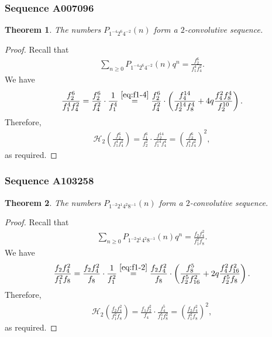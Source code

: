 \documentclass[12pt,reqno]{amsart}
\numberwithin{equation}{section}
\theoremstyle{plain}
\newtheorem{theorem}{Theorem}[section]
\theoremstyle{definition}
\theoremstyle{named}
\newcommand{\HH}{\mathcal{H}}
\begin{document}
\subsubsection{Sequence A007096}

\begin{theorem}\label{th:A007096}
	The numbers $P_{1^{-4} 2^6 4^{-2}}(n)$ form a $2$-convolutive sequence.
\end{theorem}

\begin{proof}
	Recall that
	\begin{align*}
		\sum_{n\ge 0} P_{1^{-4} 2^6 4^{-2}}(n) q^n = \frac{f_2^6}{f_1^4 f_4^2}.
	\end{align*}
	We have
	\begin{align*}
		\frac{f_2^6}{f_1^4 f_4^2} = \frac{f_2^6}{f_4^2}\cdot \frac{1}{f_1^4} \overset{\eqref{eq:f1-4}}{=} \frac{f_2^6}{f_4^2}\cdot \left(\frac{f_4^{14}}{f_2^{14}f_8^4}+4q\frac{f_4^2f_8^4}{f_2^{10}}\right).
	\end{align*}
	Therefore,
	\begin{align*}
		\HH_2\left(\frac{f_2^6}{f_1^4 f_4^2}\right) = \frac{f_1^6}{f_2^2}\cdot \frac{f_2^{14}}{f_1^{14}f_4^4} = \left(\frac{f_2^6}{f_1^4 f_4^2}\right)^2,
	\end{align*}
	as required.
\end{proof}

\subsubsection{Sequence A103258}

\begin{theorem}\label{th:A103258}
	The numbers $P_{1^{-2} 2^1 4^{2} 8^{-1}}(n)$ form a $2$-convolutive sequence.
\end{theorem}

\begin{proof}
	Recall that
	\begin{align*}
		\sum_{n\ge 0} P_{1^{-2} 2^1 4^{2} 8^{-1}}(n) q^n = \frac{f_2 f_4^2}{f_1^2 f_8}.
	\end{align*}
	We have
	\begin{align*}
		\frac{f_2 f_4^2}{f_1^2 f_8} = \frac{f_2 f_4^2}{f_8}\cdot \frac{1}{f_1^2} \overset{\eqref{eq:f1-2}}{=} \frac{f_2 f_4^2}{f_8}\cdot \left(\frac{f_8^5}{f_2^5f_{16}^2}+2q\frac{f_4^2f_{16}^2}{f_2^5f_8}\right).
	\end{align*}
	Therefore,
	\begin{align*}
		\HH_2\left(\frac{f_2 f_4^2}{f_1^2 f_8}\right) = \frac{f_1 f_2^2}{f_4}\cdot \frac{f_4^5}{f_1^5f_{8}^2} = \left(\frac{f_2 f_4^2}{f_1^2 f_8}\right)^2,
	\end{align*}
	as required.
\end{proof}
\end{document}
